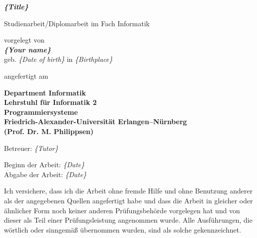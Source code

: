 \documentclass[a4paper,12pt,BCOR0mm,headsepline,draft,twoside]{scrbook}
\newcommand{\thethesis}[0]{%
  Studienarbeit/Diplomarbeit
}
\newcommand{\field}[1]{%
  {\itshape \{#1\}}
}
\begin{document}
\frontmatter
\begin{titlepage}
  
  \begin{center}
    
    {\Huge \bf
      \field{Title}\\
    } 
    
    \vspace*{1cm}
    \thethesis im Fach Informatik
    \vspace{3cm}
    
    {\large vorgelegt von} \\
    \vspace*{0.7cm}
    {\Large \bf \field{Your name}} \\
    \vspace*{0.7cm}
    {\large geb. \field{Date of birth} in \field{Birthplace}} 
    
    \vspace{3cm}
    
    angefertigt am 

    \vspace{1cm}
    
    {\bf 
      Department Informatik \\
      Lehrstuhl f\"ur Informatik 2\\
      Programmiersysteme \\
      Friedrich-Alexander-Universit\"at Erlangen--N\"urnberg \\
      (Prof. Dr. M. Philippsen)
      }
    
    \vspace{2cm}

    Betreuer: \field{Tutor} 
    
    \vspace{1cm}
    
    Beginn der Arbeit: \field{Date} \\
    Abgabe der Arbeit: \field{Date}
    
  \end{center}
\end{titlepage}

\clearpage{\pagestyle{empty}\cleardoublepage}

\thispagestyle{empty}
Ich versichere, dass ich die Arbeit ohne fremde Hilfe und ohne Benutzung
anderer als der angegebenen Quellen angefertigt habe und dass die Arbeit in
gleicher oder \"ahnlicher Form noch keiner anderen Pr\"ufungsbeh\"orde
vorgelegen hat und von dieser als Teil einer Pr\"ufungsleistung angenommen
wurde. Alle Ausf\"uhrungen, die w\"ortlich oder sinngem\"a\ss{} \"ubernommen
wurden, sind als solche gekennzeichnet.
\end{document}

